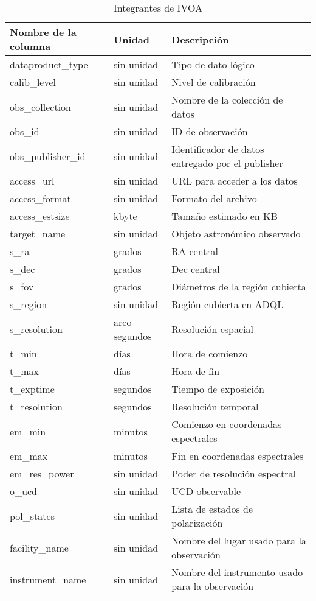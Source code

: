 \begin{table}[h!t]
	\centering
	\begin{tabular}{|l|l|l|} 
		\hline
		Nombre de la columna & Unidad & Descripción \\
		\hline
		dataproduct\_type & sin unidad & Tipo de dato lógico \\
		calib\_level & sin unidad & Nivel de calibración \\
		obs\_collection & sin unidad & Nombre de la colección de datos \\
		obs\_id & sin unidad & ID de observación \\
		obs\_publisher\_id & sin unidad & Identificador de datos entregado por el publisher \\
		access\_url & sin unidad & URL para acceder a los datos \\
		access\_format & sin unidad & Formato del archivo \\
		access\_estsize & kbyte & Tamaño estimado en KB \\
		target\_name & sin unidad & Objeto astronómico observado \\
		s\_ra & grados & RA central \\
		s\_dec & grados & Dec central \\
		s\_fov & grados & Diámetros de la región cubierta \\
		s\_region & sin unidad & Región cubierta en ADQL \\
		s\_resolution & arco segundos & Resolución espacial \\
		t\_min & días & Hora de comienzo \\
		t\_max & días & Hora de fin \\
		t\_exptime & segundos & Tiempo de exposición \\
		t\_resolution & segundos & Resolución temporal \\
		em\_min & minutos & Comienzo en coordenadas espectrales \\
		em\_max & minutos & Fin en coordenadas espectrales \\
		em\_res\_power & sin unidad & Poder de resolución espectral \\
		o\_ucd & sin unidad & UCD observable \\
		pol\_states & sin unidad & Lista de estados de polarización \\
		facility\_name & sin unidad & Nombre del lugar usado para la observación \\
		instrument\_name & sin unidad & Nombre del instrumento usado para la observación \\
		\hline
	\end{tabular}
	\caption{Integrantes de IVOA}
	\label{table:tap_column_name}
\end{table}

